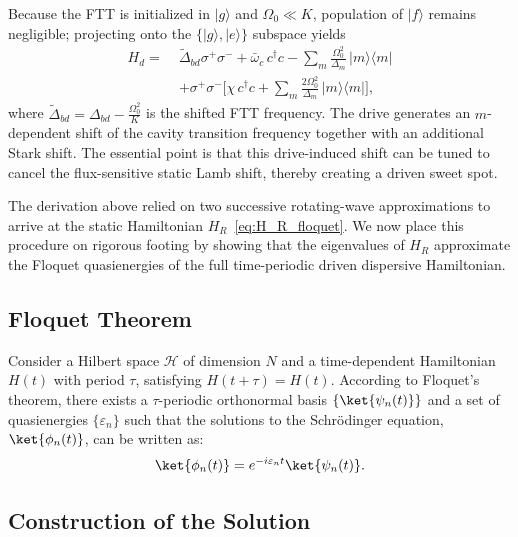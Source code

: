 Because the FTT is initialized in $|g\rangle$ and $\Omega_0\ll K$, population of $|f\rangle$ remains negligible; projecting onto the $\{|g\rangle,|e\rangle\}$ subspace yields
\begin{equation}
\label{eq:Hd_two_level}
\begin{aligned}
H_d=\;&\widetilde{\Delta}_{bd}\sigma^+\sigma^-
+\bar\omega_c\,c^\dagger c
-\sum_m \frac{\Omega_0^2}{\Delta_m}\,|m\rangle\langle m| \\
&+\sigma^+\sigma^-\!\Biggl[
\chi\,c^\dagger c
+\sum_m \frac{2\Omega_0^2}{\Delta_m}\,|m\rangle\langle m|
\Biggr],
\end{aligned}
\end{equation}
where $\widetilde{\Delta}_{bd} = \Delta_{bd}-\frac{\Omega_0^2}{K}$ is the shifted FTT frequency. The drive generates an $m$-dependent shift of the cavity transition frequency together with an additional Stark shift. The essential point is that this drive-induced shift can be tuned to cancel the flux-sensitive static Lamb shift, thereby creating a driven sweet spot.


The derivation above relied on two successive rotating-wave approximations to arrive at the static Hamiltonian $H_R$~\eqref{eq:H_R_floquet}. We now place this procedure on rigorous footing by showing that the eigenvalues of $H_R$ approximate the Floquet quasienergies of the full time-periodic driven dispersive Hamiltonian.

\subsection{Floquet Theorem}
\label{sec:floquet}
Consider a Hilbert space $\mathcal{H}$ of dimension $N$ and a time-dependent Hamiltonian $H(t)$ with period $\tau$, satisfying $H(t+\tau) = H(t)$. According to Floquet's theorem, there exists a $\tau$-periodic orthonormal basis $\{\ket{\psi_n(t)}\}$ and a set of quasienergies $\{\varepsilon_n\}$ such that the solutions to the Schr\"odinger equation, $\ket{\phi_n(t)}$, can be written as:
\begin{equation}
    \ket{\phi_n(t)} = e^{-i\varepsilon_n t} \ket{\psi_n(t)}.
\end{equation}

\subsection{Construction of the Solution}

